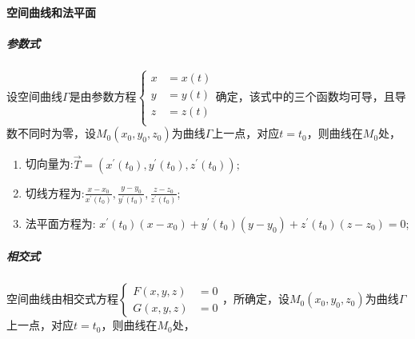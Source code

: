 \documentclass[
]{article}
\begin{document}
\hypertarget{ux7a7aux95f4ux66f2ux7ebfux548cux6cd5ux5e73ux9762}{%
\paragraph{空间曲线和法平面}\label{ux7a7aux95f4ux66f2ux7ebfux548cux6cd5ux5e73ux9762}}

\hypertarget{ux53c2ux6570ux5f0f}{%
\subparagraph{参数式}\label{ux53c2ux6570ux5f0f}}

设空间曲线\(\Gamma\)是由参数方程\(\left\{
\begin{aligned}
x & = x(t) \\
y & = y(t) \\
z & = z(t) \\
\end{aligned}
\right.\)确定，该式中的三个函数均可导，且导数不同时为零，设\(M_0(x_0,y_0,z_0)\)为曲线\(\Gamma \)上一点，对应\(t = t_0\)，则曲线在\(M_0\)处，

\begin{enumerate}
\def\labelenumi{\arabic{enumi}.}
\item
  切向量为:\(\vec{T}= (x^{'}(t_0),y^{'}(t_0),z^{'}(t_0));\)
\item
  切线方程为:\(\frac{x-x_0}{x^{'}(t_0)},\frac{y-y_0}{y^{'}(t_0)},\frac{z-z_0}{z^{'}(t_0)}\);
\item
  法平面方程为:
  \(x^{'}(t_0)(x-x_0)+y^{'}(t_0)(y-y_0)+z^{'}(t_0)(z-z_0)=0\);
\end{enumerate}

\hypertarget{ux76f8ux4ea4ux5f0f}{%
\subparagraph{相交式}\label{ux76f8ux4ea4ux5f0f}}

空间曲线由相交式方程\(\left\{ \begin{aligned} F(x,y,z) & = 0 \\ G(x,y,z) & = 0 \end{aligned} \right.\)，所确定，设\(M_0(x_0,y_0,z_0)\)为曲线\(\Gamma\)上一点，对应\(t=t_0\)，则曲线在\(M_0\)处，
\end{document}
